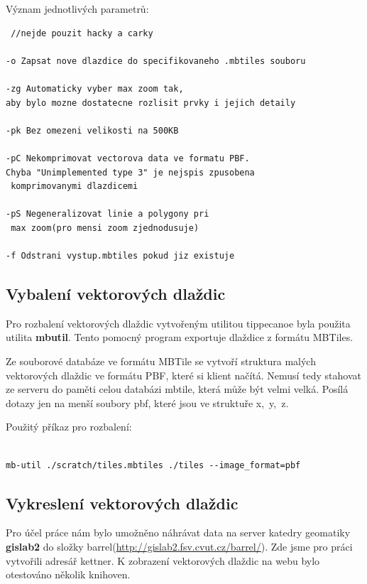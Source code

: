 \documentclass[12pt]{article}
\begin{document}
\vspace{0.5cm}
Význam jednotlivých parametrů:
\begin{lstlisting} //nejde pouzit hacky a carky

-o Zapsat nove dlazdice do specifikovaneho .mbtiles souboru

-zg Automaticky vyber max zoom tak,
aby bylo mozne dostatecne rozlisit prvky i jejich detaily

-pk Bez omezeni velikosti na 500KB

-pC Nekomprimovat vectorova data ve formatu PBF.
Chyba "Unimplemented type 3" je nejspis zpusobena
 komprimovanymi dlazdicemi

-pS Negeneralizovat linie a polygony pri
 max zoom(pro mensi zoom zjednodusuje)

-f Odstrani vystup.mbtiles pokud jiz existuje
\end{lstlisting}


\subsection{Vybalení vektorových dlaždic}
Pro rozbalení vektorových dlaždic vytvořeným utilitou tippecanoe byla použita utilita \textbf{mbutil}. Tento pomocný program exportuje dlaždice z formátu \mbox{MBTiles}. 

Ze souborové databáze ve formátu MBTile se vytvoří struktura malých vektorových dlaždic ve formátu PBF, které si klient načítá. Nemusí tedy stahovat ze serveru do paměti celou databázi mbtile, která může být velmi velká. Posílá dotazy jen na menší soubory pbf, které jsou ve struktuře \mbox{x, y, z}.

Použitý příkaz pro rozbalení:

\begin{lstlisting}

mb-util ./scratch/tiles.mbtiles ./tiles --image_format=pbf

\end{lstlisting}

\subsection{Vykreslení vektorových dlaždic}
Pro účel práce nám bylo umožněno náhrávat data na server katedry geomatiky \textbf{gislab2} do složky barrel(\url{http://gislab2.fsv.cvut.cz/barrel/}). Zde jsme pro práci vytvořili adresář kettner. K zobrazení vektorových dlaždic na webu bylo otestováno několik knihoven.
\end{document}
